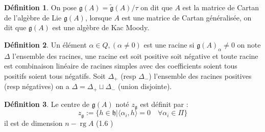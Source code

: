 \documentclass[12pt]{article}
\DeclareMathOperator{\rg}{rg}
\theoremstyle{definition}
\newtheorem{Def}{Définition}[section]
\begin{document}
\begin{Def} On pose $\mathfrak{g}(A)=\tilde{\mathfrak{g}}(A)/\tau$ on dit que  $A$ est la matrice de Cartan de l'algèbre de Lie  $\mathfrak{g}(A)$, lorsque $A$ est une matrice de Cartan généralisée, on dit que $\mathfrak{g}(A)$ est une algèbre de Kac Moody.
\end{Def}
\begin{Def} Un élément $\alpha\in Q,(\alpha\neq 0)$ est une racine si ${\mathfrak{g}}(A)_{\alpha}\neq 0$	on note $\Delta$ l'ensemble des racines, une racine est soit positive soit négative et toute racine est combinaison linéaire de racines simples avec des coefficients soient tous positifs soient tous négatifs. Soit $\Delta_+$ (resp $\Delta_-$) l'ensemble des racines positives (resp négatives) on a $\Delta=\Delta_+\sqcup\Delta_-$ (union disjointe).
\end{Def}
\begin{Def} Le centre de $\mathfrak{g}(A)$ noté $z_{\mathfrak{g}}$ est définit par : $$z_{\mathfrak{g}}:=\{h\in\mathfrak{h}\vert \langle \alpha_i,h\rangle = 0\quad\forall \alpha_i\in\Pi\}$$ il est de dimension $n-\rg A$ (1.6 \cite{Kac})\end{Def}
\end{document}
